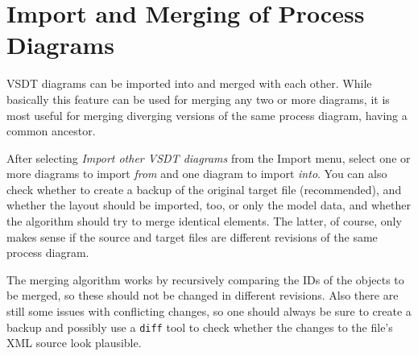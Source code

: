 
\section{Import and Merging of Process Diagrams}
\label{sec:user_features_merging}

VSDT diagrams can be imported into and merged with each other.  While basically
this feature can be used for merging any two or more diagrams, it is most useful
for merging diverging versions of the same process diagram, having a common
ancestor.

After selecting \emph{Import other VSDT diagrams} from the Import menu, select
one or more diagrams to import \emph{from} and one diagram to import \emph{into}.
You can also check whether to create a backup of the original target file
(recommended), and whether the layout should be imported, too, or only the model
data, and whether the algorithm should try to merge identical elements.  The
latter, of course, only makes sense if the source and target files are different
revisions of the same process diagram.

The merging algorithm works by recursively comparing the IDs of the objects to be
merged, so these should not be changed in different revisions.  Also there are
still some issues with conflicting changes, so one should always be sure to create
a backup and possibly use a \texttt{diff} tool to check whether the changes to
the file's XML source look plausible.

